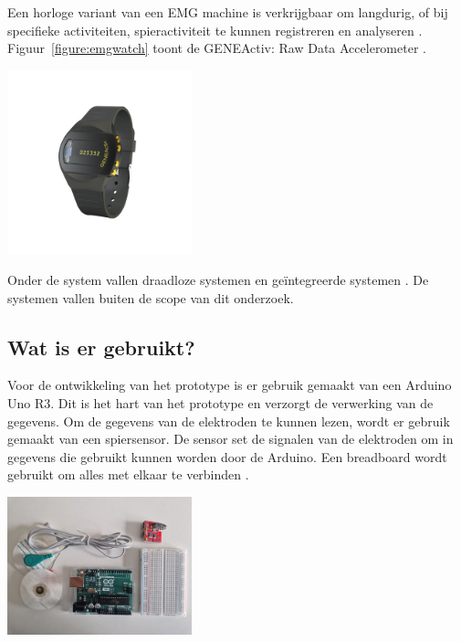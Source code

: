 Een horloge variant van een EMG machine is verkrijgbaar om langdurig, of bij specifieke activiteiten, 
spieractiviteit te kunnen registreren en analyseren \cite{sips2024,activinsights2022}. 
Figuur~\ref{figure:emgwatch} toont de GENEActiv: Raw Data Accelerometer \cite{activinsights2022}.

\begin{center}
    \includegraphics[width=0.4\textwidth]{./graphics/img-emgwatch.png}
    \label{figure:emgwatch}
\end{center}

Onder de system vallen draadloze systemen en geïntegreerde systemen \cite{gohel2020}.
De systemen vallen buiten de scope van dit onderzoek.

\subsection{Wat is er gebruikt?}

Voor de ontwikkeling van het prototype is er gebruik gemaakt van een Arduino Uno R3.
Dit is het hart van het prototype en verzorgt de verwerking van de gegevens.
Om de gegevens van de elektroden te kunnen lezen, wordt er gebruik gemaakt van een spiersensor.
De sensor set de signalen van de elektroden om in gegevens die gebruikt kunnen worden door de Arduino.
Een breadboard wordt gebruikt om alles met elkaar te verbinden \cite{emg2021}.

\begin{center}
    \includegraphics[width=0.4\textwidth]{./graphics/img-components.jpg}
    \label{figure:components}
\end{center}

